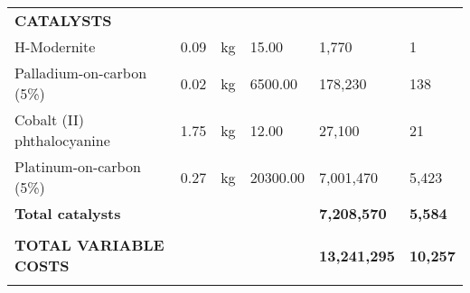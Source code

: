 \begin{table}[H]
\begin{tabular}{llllll}
\textbf{CATALYSTS}                            &                                        &                                                                    &                             & \textbf{}             &                                          \\
H-Modernite                                   & 0.09                                   & kg                                                                 & 15.00                       & 1,770                 & 1                                        \\
Palladium-on-carbon (5\%)                     & 0.02                                   & kg                                                                 & 6500.00                     & 178,230               & 138                                      \\
Cobalt (II) phthalocyanine                    & 1.75                                   & kg                                                                 & 12.00                       & 27,100                & 21                                       \\
Platinum-on-carbon (5\%)                      & 0.27                                   & kg                                                                 & 20300.00                    & 7,001,470             & 5,423                                    \\ \cline{5-6} 
\textbf{Total catalysts}                      & \textbf{}                              & \textbf{}                                                          & \textbf{}                   & \textbf{7,208,570}    & \textbf{5,584}                           \\
\textbf{}                                     & \textbf{}                              & \textbf{}                                                          & \textbf{}                   & \textbf{}             & \textbf{}                                \\ \cline{5-6} 
\textbf{TOTAL VARIABLE COSTS}                 & \textbf{}                              & \textbf{}                                                          & \textbf{}                   & \textbf{13,241,295}   & \textbf{10,257}                          \\
                                              &                                        &                                                                    &                             & \textbf{}             &                                          \\

\end{tabular}
\end{table}
